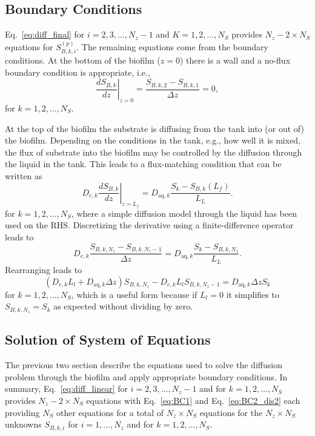 \documentclass[letterpaper, twoside]{article}
\numberwithin{equation}{section}
\newcommand{\eg}{e.g.}
\newcommand{\ie}{i.e.}
\begin{document}
\subsection{Boundary Conditions} \label{Boundary Conditions}
Eq.~\ref{eq:diff_final} for $i=2,3,\dots,N_z-1$ and $K=1,2,\dots,N_S$ provides $N_z-2 \times N_S$ equations for $S_{B,k,i}^{(p)}$.  The remaining equations come from the boundary conditions.  At the bottom of the biofilm ($z=0$) there is a wall and a no-flux boundary condition is appropriate, \ie,
\begin{equation}
  \label{eq:BC1}
  \left.\frac{d S_{B,k}}{dz}\right|_{z=0}= \frac{S_{B,k,2} - S_{B,k,1}}{\Delta z} =0,
\end{equation}
for $k=1,2,\dots,N_S$.

At the top of the biofilm the substrate is diffusing from the tank into (or out of) the biofilm.  Depending on the conditions in the tank, \eg, how well it is mixed, the flux of substrate into the biofilm may be controlled by the diffusion through the liquid in the tank.  This leads to a flux-matching condition that can be written as
\begin{equation}
  \label{eq:BC2}
  D_{e,k} \left.\frac{d S_{B,k}}{dz}\right|_{z=L_f} = D_{\mathrm{aq},k} \frac{S_k - S_{B,k}(L_f)}{L_L}.
\end{equation}
for $k=1,2,\dots,N_S$, where a simple diffusion model through the liquid has been used on the RHS.  Discretizing the derivative using a finite-difference operator leads to
\begin{equation}
  \label{eq:BC2_dis}
  D_{e,k} \frac{S_{B,k,N_z} - S_{B,k,N_z-1}}{\Delta z} = D_{\mathrm{aq},k} \frac{S_k - S_{B,k,N_z}}{L_L}.
\end{equation}
Rearranging leads to
\begin{equation}
  \label{eq:BC2_dis2}
  \left(D_{e,k} L_l + D_{\mathrm{aq},k} \Delta z\right) S_{B,k,N_z} - D_{e,k} L_l S_{B,k,N_z-1} = D_{\mathrm{aq},k} \Delta z S_k
\end{equation}
for $k=1,2,\dots,N_S$, which is a useful form because if $L_l=0$ it simplifies to $S_{B,k, N_z}=S_k$ as expected without dividing by zero.

\subsection{Solution of System of Equations}
The previous two section describe the equations used to solve the diffusion problem through
the biofilm and apply appropriate boundary conditions.
In summary, Eq.~\ref{eq:diff_linear} for $i=2,3,\dots,N_z-1$ and for $k=1,2,\dots,N_S$ provides $N_z-2 \times N_S$ equations with
Eq.~\ref{eq:BC1} and Eq.~\ref{eq:BC2_dis2} each providing $N_S$ other equations
for a total of $N_z\times N_S$ equations for the $N_z\times N_S$ unknowns $S_{B,k,i}$ for $i=1,\dots,N_z$ and for $k=1,2,\dots,N_S$.
\end{document}
